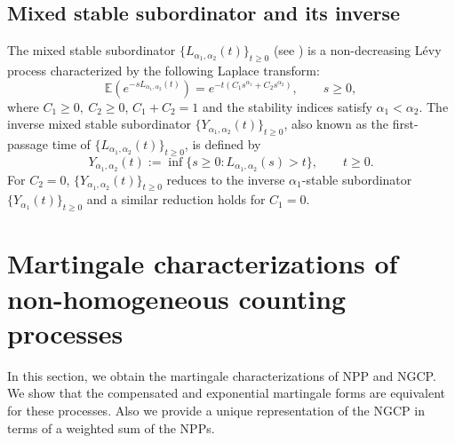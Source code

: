 \documentclass[11pt,oneside,reqno]{amsart}
\theoremstyle{definition}
\theoremstyle{remarkstyle}
\begin{document}
\subsection{Mixed stable subordinator and its inverse}\label{MSS} 
The mixed stable subordinator $\{L_{\alpha_1,\alpha_2}(t)\}_{t\ge0}$ (see \citet{Aletti2018}) is a non-decreasing Lévy process characterized by the following Laplace transform:
\begin{equation*}
    \mathbb{E}\left(e^{-sL_{\alpha_1,\alpha_2}(t)}\right)
    = e^{-t\left(C_1 s^{\alpha_1} + C_2 s^{\alpha_2}\right)}, \qquad s \ge 0,
\end{equation*}
where $C_1\ge 0,~C_2\ge0$, $C_1+C_2=1$ and the stability indices satisfy $\alpha_1<\alpha_2$. 
The inverse mixed stable subordinator $\{Y_{\alpha_1,\alpha_2}(t)\}_{t\ge0}$, 
also known as the first-passage time of $\{L_{\alpha_1,\alpha_2}(t)\}_{t\ge 0}$, 
is defined by
\begin{equation*}
    Y_{\alpha_1,\alpha_2}(t)
    := \inf\{s\ge0 : L_{\alpha_1,\alpha_2}(s) > t\}, \qquad t\ge0.
\end{equation*}
For $C_2=0$, $\{Y_{\alpha_1,\alpha_2}(t)\}_{t\ge 0}$ reduces to the inverse $\alpha_1$-stable subordinator $\{Y_{\alpha_1}(t)\}_{t\ge0}$ and a similar reduction holds for $C_1=0$.

\section{Martingale characterizations of non-homogeneous counting processes}\label{sec 3}
In this section, we obtain the martingale characterizations of NPP and NGCP. We show that the compensated and exponential martingale forms are equivalent for these processes. Also we provide a unique representation of the NGCP in terms of a weighted sum of the NPPs. 
\end{document}

